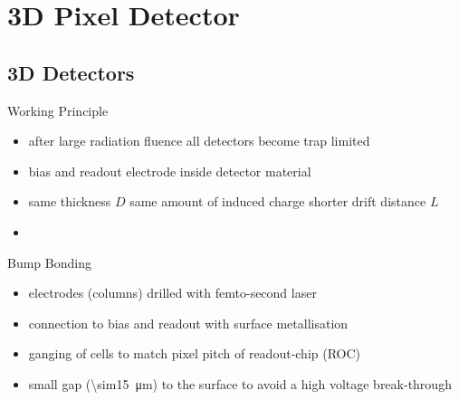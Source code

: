 \section{3D Pixel Detector}
\subsection{3D Detectors}
\begin{frame}{Working Principle}

	
	\begin{itemize}\itemfill
		\item after large radiation fluence all detectors become trap limited
		\item bias and readout electrode inside detector material
		\item same thickness $D$ \ra same amount of induced charge \ra shorter drift distance $L$
		\item {}
	\end{itemize}

\end{frame}

\begin{frame}{Bump Bonding}

	
	\begin{itemize}\itemfill
		\item electrodes (columns) drilled with femto-second laser
		\item connection to bias and readout with surface metallisation
		\item ganging of cells to match pixel pitch of readout-chip (ROC)
		\item small gap (\SI{\sim15}{\micro\meter}) to the surface to avoid a high voltage break-through 
	\end{itemize}

\end{frame}
